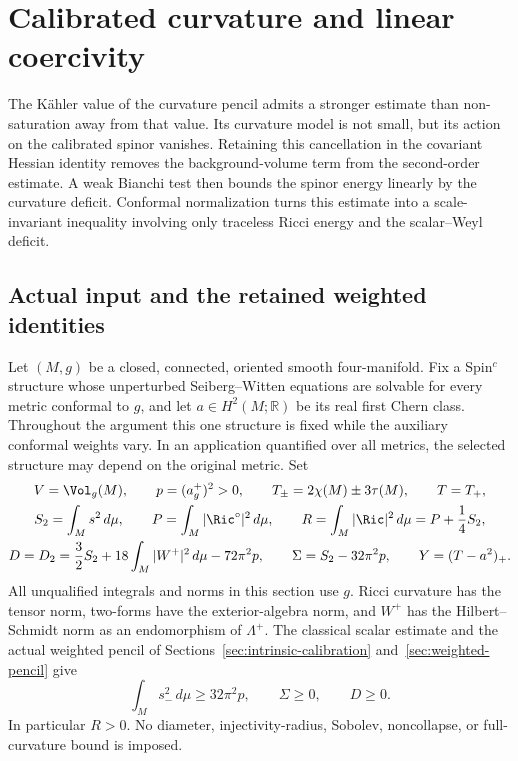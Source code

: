 \section{Calibrated curvature and linear coercivity}\label{sec:linear-coercivity}

The K\"ahler value of the curvature pencil admits a stronger estimate than
non-saturation away from that value.  Its curvature model is not small, but
its action on the calibrated spinor vanishes.  Retaining this cancellation
in the covariant Hessian identity removes the background-volume term from
the second-order estimate.  A weak Bianchi test then bounds the spinor
energy linearly by the curvature deficit.  Conformal normalization turns
this estimate into a scale-invariant inequality involving only traceless
Ricci energy and the scalar--Weyl deficit.

\subsection{Actual input and the retained weighted identities}

Let $(M,g)$ be a closed, connected, oriented smooth four-manifold.  Fix a
Spin$^c$ structure whose unperturbed Seiberg--Witten equations are solvable
for every metric conformal to $g$, and let $a\in H^2(M;\mathbb R)$ be its
real first Chern class.  Throughout the argument this one structure is
fixed while the auxiliary conformal weights vary.  In an application
quantified over all metrics, the selected structure may depend on the
original metric.  Set
\begin{equation}\label{eq:lc-energies}
\begin{gathered}
 V=\Vol_g(M),\qquad p=(a_g^+)^2>0,\qquad
 T_\pm=2\chi(M)\pm3\tau(M),\qquad T=T_+,\\
 S_2=\int_M s^2\,d\mu,\qquad
 P=\int_M|\Ric^\circ|^2\,d\mu,\qquad
 R=\int_M|\Ric|^2\,d\mu=P+\frac14S_2,\\
 D=D_2=\frac32 S_2+18\int_M|W^+|^2\,d\mu-72\pi^2p,\qquad
 \Sigma=S_2-32\pi^2p,\qquad Y=(T-a^2)_+.
\end{gathered}
\end{equation}
All unqualified integrals and norms in this section use $g$.  Ricci
curvature has the tensor norm, two-forms have the exterior-algebra norm,
and $W^+$ has the Hilbert--Schmidt norm as an endomorphism of $\Lambda^+$.
The classical scalar estimate and the actual weighted pencil of
Sections~\ref{sec:intrinsic-calibration} and~\ref{sec:weighted-pencil} give
\begin{equation}\label{eq:lc-nonnegative}
 \int_M s_-^2\,d\mu\ge32\pi^2p,\qquad \Sigma\ge0,\qquad D\ge0.
\end{equation}
In particular $R>0$.  No diameter, injectivity-radius, Sobolev,
noncollapse, or full-curvature bound is imposed.

